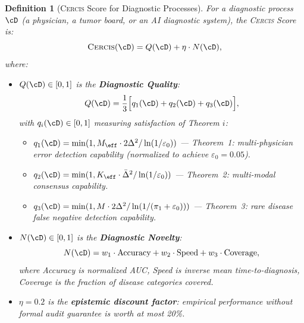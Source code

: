 \documentclass[11pt,a4paper]{article}
\newtheorem{definition}[theorem]{Definition}
\theoremstyle{definition}
\newcommand{\Cercis}{\textsc{Cercis}}
\begin{document}
\begin{definition}[\Cercis{} Score for Diagnostic Processes]
\label{def:cercis_diag}
For a diagnostic process $\cD$ (a physician, a tumor board, or an
AI diagnostic system), the \Cercis{} Score is:
\begin{equation}\label{eq:cercis_diag}
    \Cercis(\cD) = Q(\cD) + \eta \cdot N(\cD),
\end{equation}
where:
\begin{itemize}[nosep]
    \item $Q(\cD) \in [0,1]$ is the \textbf{Diagnostic Quality}:
    \begin{equation}
        Q(\cD) = \frac{1}{3}\Bigl[q_1(\cD) + q_2(\cD) + q_3(\cD)\Bigr],
    \end{equation}
    with $q_i(\cD) \in [0,1]$ measuring satisfaction of Theorem $i$:
    \begin{itemize}[nosep]
        \item $q_1(\cD) = \min(1, M_{\eff} \cdot 2\Delta^2 / \ln(1/\varepsilon_0))$
        --- Theorem~1: multi-physician error detection capability (normalized to
        achieve $\varepsilon_0 = 0.05$).
        \item $q_2(\cD) = \min(1, K_{\eff} \cdot \bar{\Delta}^2 / \ln(1/\varepsilon_0))$
        --- Theorem~2: multi-modal consensus capability.
        \item $q_3(\cD) = \min(1, M \cdot 2\Delta^2 / \ln(1/(\pi_1 + \varepsilon_0)))$
        --- Theorem~3: rare disease false negative detection capability.
    \end{itemize}

    \item $N(\cD) \in [0,1]$ is the \textbf{Diagnostic Novelty}:
    \begin{equation}
        N(\cD) = w_1 \cdot \text{Accuracy} + w_2 \cdot \text{Speed} + w_3 \cdot \text{Coverage},
    \end{equation}
    where Accuracy is normalized AUC, Speed is inverse mean time-to-diagnosis,
    Coverage is the fraction of disease categories covered.

    \item $\eta = 0.2$ is the \textbf{epistemic discount factor}:
    empirical performance without formal audit guarantee is worth at most 20\%.
\end{itemize}
\end{definition}
\end{document}
